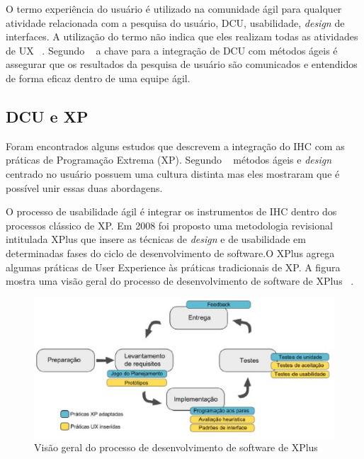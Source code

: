 
O termo experiência do usuário é utilizado na comunidade ágil para qualquer atividade relacionada com a pesquisa do usuário, DCU, usabilidade, \emph{design} de interfaces. A utilização do termo não indica que eles realizam todas as atividades de UX ~\cite{santos2012}.
%
Segundo ~ a chave para a integração de DCU com métodos ágeis é assegurar que os resultados da pesquisa de usuário são comunicados e entendidos de forma eficaz dentro de uma equipe ágil.


\subsection {DCU e XP}

Foram encontrados alguns estudos que descrevem a integração do IHC com as práticas de Programação Extrema (XP). Segundo ~ métodos ágeis e \emph{design} centrado no usuário possuem uma cultura distinta mas eles mostraram que é possível unir essas duas abordagens.

O processo de usabilidade ágil é integrar os instrumentos de IHC dentro dos processos clássico de XP. %
%
Em 2008 foi proposto uma metodologia revisional intitulada XPlus que insere as técnicas de \emph{design} e de usabilidade em determinadas fases do ciclo de desenvolvimento de software.O XPlus agrega algumas práticas de User Experience às práticas tradicionais de XP. A figura mostra uma visão geral do processo de desenvolvimento de software de XPlus ~\cite{guimaraesxplus}.

\begin{figure}[h]
    \centering
    \includegraphics[keepaspectratio=true,scale=0.60]
      {figuras/xplus.eps}
    \caption{Visão geral do processo de desenvolvimento de software de XPlus}
    \label{ciclo_xplus}
\end{figure}

